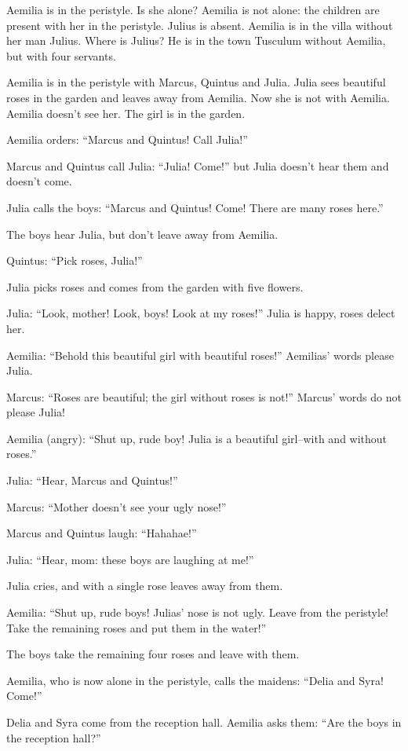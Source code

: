Aemilia is in the peristyle. Is she alone? Aemilia is not alone: the children are present with her in the peristyle. Julius is absent. Aemilia is in the villa without her man Julius. Where is Julius? He is in the town Tusculum without Aemilia, but with four servants.

Aemilia is in the peristyle with Marcus, Quintus and Julia. Julia sees beautiful roses in the garden and leaves away from Aemilia. Now she is not with Aemilia. Aemilia doesn't see her. The girl is in the garden.

Aemilia orders: ``Marcus and Quintus! Call Julia!''

Marcus and Quintus call Julia: ``Julia! Come!'' but Julia doesn't hear them and doesn't come.

Julia calls the boys: ``Marcus and Quintus! Come! There are many roses here.''

The boys hear Julia, but don't leave away from Aemilia.

Quintus: ``Pick roses, Julia!''

Julia picks roses and comes from the garden with five flowers.

Julia: ``Look, mother! Look, boys! Look at my roses!'' Julia is happy, roses delect her.

Aemilia: ``Behold this beautiful girl with beautiful roses!'' Aemilias' words please Julia.

Marcus: ``Roses are beautiful; the girl without roses is not!'' Marcus' words do not please Julia!

Aemilia (angry): ``Shut up, rude boy! Julia is a beautiful girl--with and without roses.''

Julia: ``Hear, Marcus and Quintus!''

Marcus: ``Mother doesn't see your ugly nose!''

Marcus and Quintus laugh: ``Hahahae!''

Julia: ``Hear, mom: these boys are laughing at me!''

Julia cries, and with a single rose leaves away from them.

Aemilia: ``Shut up, rude boys! Julias' nose is not ugly. Leave from the peristyle! Take the remaining roses and put them in the water!''

The boys take the remaining four roses and leave with them.

Aemilia, who is now alone in the peristyle, calls the maidens: ``Delia and Syra! Come!''

Delia and Syra come from the reception hall. Aemilia asks them: ``Are the boys in the reception hall?''

